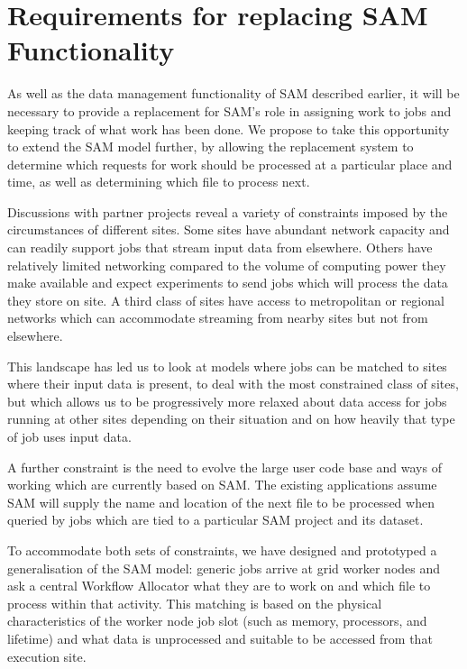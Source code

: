 \documentclass[../main-v1.tex]{subfiles}
\begin{document}
\section{Requirements for replacing SAM Functionality}

As well as the data management functionality of SAM described earlier, it will be necessary to provide a replacement for SAM's role in assigning work to jobs and keeping track of what work has been done. We propose to take this opportunity to extend the SAM model further, by allowing the replacement system to determine which requests for work should be processed at a particular place and time, as well as determining which file to process next.

Discussions with partner projects reveal a variety of constraints imposed by the circumstances of different sites. Some sites have 
abundant network capacity and can readily support jobs that stream input data from elsewhere. Others have relatively limited networking
compared to the volume of computing power they make available and
expect experiments to send jobs which will process the data they
store on site. A third class of sites have access to metropolitan or 
regional networks which can accommodate streaming from nearby sites
but not from elsewhere.

This landscape has led us to look at models where jobs can be matched to sites where their input data is present, to deal with the most constrained class of sites, but which allows us to be progressively more relaxed about data access for jobs running at other sites depending on their situation and on how heavily that type of job uses input data.

A further constraint is the need to evolve the large user code base and ways of working which are currently based on SAM. The existing applications assume SAM will supply the name and location of the next file to be processed when queried by jobs which are tied to a particular SAM project and its dataset. 

To accommodate both sets of constraints, we have designed and prototyped a generalisation of the SAM model: generic jobs arrive at grid worker nodes and ask a central Workflow Allocator what they are to work on and which file to process within that activity. This matching is based on the physical characteristics of the worker node job slot (such as memory, processors, and lifetime) and what data is unprocessed and suitable to be accessed from that execution site. 
\end{document}
